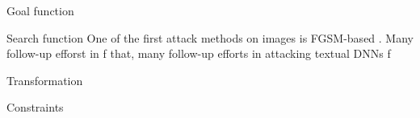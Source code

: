 Goal function

Search function
One of the first attack methods on images is FGSM-based \cite{??}. Many follow-up efforst in f that, many follow-up efforts in attacking textual DNNs f

\cite{li2018textbugger}


Transformation

Constraints